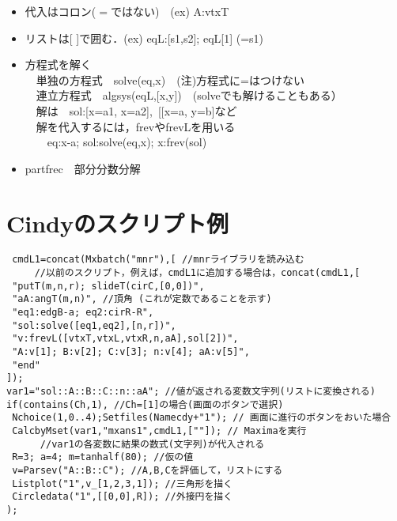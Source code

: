 \documentclass[a4j,12pt]{jarticle}
\begin{document}
\begin{itemize}
\item 代入はコロン($=$ではない)　(ex) A:vtxT\vspace{-2mm}
\item リストは[ ]で囲む．(ex) eqL:[s1,s2];  eqL[1] (=s1)\vspace{-2mm}
\item  方程式を解く\\
　単独の方程式　solve(eq,x)　(注)方程式に=はつけない\\
　連立方程式　algsys(eqL,[x,y])　(solveでも解けることもある）\\
　解は　sol:[x=a1, x=a2],\ [[x=a, y=b]など\\
　解を代入するには，frevやfrevLを用いる\\
　　eq:x-a; sol:solve(eq,x); x:frev(sol)\vspace{-2mm}
\item  partfrec　部分分数分解  \vspace{-2mm}
\end{itemize}

\section{Cindyのスクリプト例}

\begin{verbatim}
 cmdL1=concat(Mxbatch("mnr"),[ //mnrライブラリを読み込む
　　　//以前のスクリプト，例えば，cmdL1に追加する場合は，concat(cmdL1,[
 "putT(m,n,r); slideT(cirC,[0,0])",
 "aA:angT(m,n)", //頂角 (これが定数であることを示す)
 "eq1:edgB-a; eq2:cirR-R",
 "sol:solve([eq1,eq2],[n,r])",
 "v:frevL([vtxT,vtxL,vtxR,n,aA],sol[2])",
 "A:v[1]; B:v[2]; C:v[3]; n:v[4]; aA:v[5]",
 "end"
]);
var1="sol::A::B::C::n::aA"; //値が返される変数文字列(リストに変換される)
if(contains(Ch,1), //Ch=[1]の場合(画面のボタンで選択)
 Nchoice(1,0..4);Setfiles(Namecdy+"1"); // 画面に進行のボタンをおいた場合
 CalcbyMset(var1,"mxans1",cmdL1,[""]); // Maximaを実行
 　　　//var1の各変数に結果の数式(文字列)が代入される
 R=3; a=4; m=tanhalf(80); //仮の値
 v=Parsev("A::B::C"); //A,B,Cを評価して，リストにする
 Listplot("1",v_[1,2,3,1]); //三角形を描く
 Circledata("1",[[0,0],R]); //外接円を描く
);
\end{verbatim}
  
\end{document}
